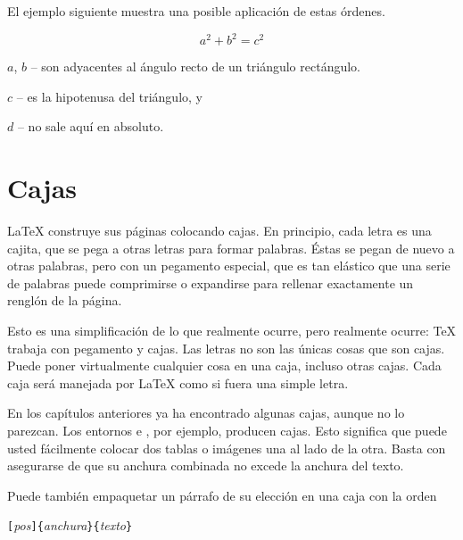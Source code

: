 El ejemplo siguiente muestra una posible aplicación de estas órdenes.

\begin{example}
\flushleft
\newenvironment{vardesc}[1]{%
  \settowidth{\parindent}{#1:\ }
  \makebox[0pt][r]{#1:\ }}{}

\begin{displaymath}
a^2+b^2=c^2
\end{displaymath}

\begin{vardesc}{Donde}$a$, 
$b$ -- son adyacentes al ángulo
recto de un triángulo rectángulo.

$c$ -- es la hipotenusa del
triángulo, y 

$d$ -- no sale aquí
en absoluto. 
\end{vardesc}
\end{example}

\section{Cajas}

\LaTeX{} construye sus páginas colocando cajas.  En principio, cada letra es una cajita, que se pega a otras letras para formar palabras. Éstas se pegan de nuevo a otras palabras, pero con un pegamento especial, que es tan elástico que una serie de palabras puede comprimirse o expandirse para rellenar exactamente un renglón de la página.

Esto es una simplificación de lo que realmente ocurre, pero realmente ocurre: \TeX{} trabaja con pegamento y cajas. Las letras no son las únicas cosas que son cajas.  Puede poner virtualmente cualquier cosa en una caja, incluso otras cajas.  Cada caja será manejada por \LaTeX{} como si fuera una simple letra.

En los capítulos anteriores ya ha encontrado algunas cajas, aunque no lo parezcan.  Los entornos  e , por ejemplo, producen cajas.  Esto significa que puede usted fácilmente colocar dos tablas o imágenes una al lado de la otra.  Basta con asegurarse de que su anchura combinada no excede la anchura del texto.

Puede también empaquetar un párrafo de su elección en una caja con la orden

\begin{lscommand}
\verb|[|\emph{pos}\verb|]{|\emph{anchura}\verb|}{|\emph{texto}\verb|}|
\end{lscommand}

